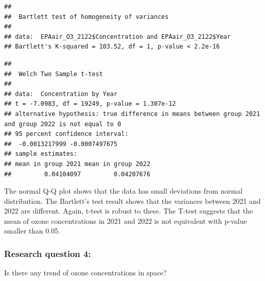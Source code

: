 \documentclass[
  12pt,
]{article}
\begin{document}
\begin{verbatim}
## 
##  Bartlett test of homogeneity of variances
## 
## data:  EPAair_O3_2122$Concentration and EPAair_O3_2122$Year
## Bartlett's K-squared = 103.52, df = 1, p-value < 2.2e-16
\end{verbatim}

\begin{verbatim}
## 
##  Welch Two Sample t-test
## 
## data:  Concentration by Year
## t = -7.0983, df = 19249, p-value = 1.307e-12
## alternative hypothesis: true difference in means between group 2021 and group 2022 is not equal to 0
## 95 percent confidence interval:
##  -0.0013217999 -0.0007497675
## sample estimates:
## mean in group 2021 mean in group 2022 
##         0.04104097         0.04207676
\end{verbatim}

The normal Q-Q plot shows that the data has small deviations from normal
distribution. The Bartlett's test result shows that the variances
between 2021 and 2022 are different. Again, t-test is robust to these.
The T-test suggests that the mean of ozone concentrations in 2021 and
2022 is not equivalent with p-value smaller than 0.05.

\hypertarget{research-question-4}{%
\subsubsection{Research question 4:}\label{research-question-4}}

Is there any trend of ozone concentrations in space?
\end{document}
